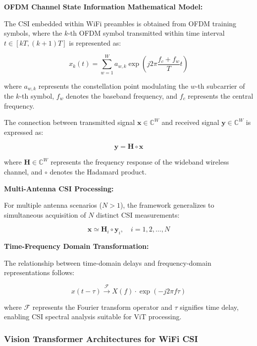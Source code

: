 \documentclass[journal]{IEEEtran}
\begin{document}
\textbf{OFDM Channel State Information Mathematical Model:}

The CSI embedded within WiFi preambles is obtained from OFDM training symbols, where the $k$-th OFDM symbol transmitted within time interval $t \in [kT, (k+1)T]$ is represented as:

\begin{equation}
x_k(t) = \sum_{w=1}^{W} a_{w,k} \exp\left(j2\pi\frac{f_c + f_w}{T}t\right)
\label{eq:vit_ofdm_symbol}
\end{equation}

where $a_{w,k}$ represents the constellation point modulating the $w$-th subcarrier of the $k$-th symbol, $f_w$ denotes the baseband frequency, and $f_c$ represents the central frequency.

The connection between transmitted signal $\mathbf{x} \in \mathbb{C}^W$ and received signal $\mathbf{y} \in \mathbb{C}^W$ is expressed as:

\begin{equation}
\mathbf{y} = \mathbf{H} \circ \mathbf{x}
\label{eq:vit_channel_relationship}
\end{equation}

where $\mathbf{H} \in \mathbb{C}^W$ represents the frequency response of the wideband wireless channel, and $\circ$ denotes the Hadamard product.

\textbf{Multi-Antenna CSI Processing:}

For multiple antenna scenarios ($N > 1$), the framework generalizes to simultaneous acquisition of $N$ distinct CSI measurements:

\begin{equation}
\mathbf{x} \simeq \mathbf{H}_i \circ \mathbf{y}_i, \quad i = 1, 2, \ldots, N
\label{eq:vit_multi_antenna}
\end{equation}

\textbf{Time-Frequency Domain Transformation:}

The relationship between time-domain delays and frequency-domain representations follows:

\begin{equation}
x(t - \tau) \xrightarrow{\mathcal{F}} X(f) \cdot \exp(-j2\pi f\tau)
\label{eq:vit_fourier_transform}
\end{equation}

where $\mathcal{F}$ represents the Fourier transform operator and $\tau$ signifies time delay, enabling CSI spectral analysis suitable for ViT processing.

\subsubsection{Vision Transformer Architectures for WiFi CSI}
\end{document}
